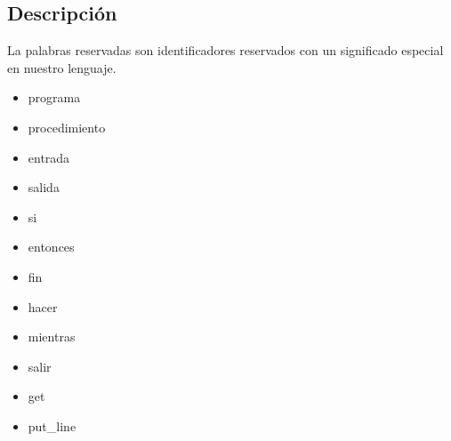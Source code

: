         \subsection{Descripción}
        
        La palabras reservadas son identificadores reservados con un significado especial en nuestro lenguaje.
        
        \begin{itemize}
             \item programa
             \item procedimiento
             \item entrada
             \item salida
             \item si
             \item entonces
             \item fin
             \item hacer
             \item mientras
             \item salir
             \item get
             \item put\_line
       \end{itemize}

       \hfill
       \clearpage



